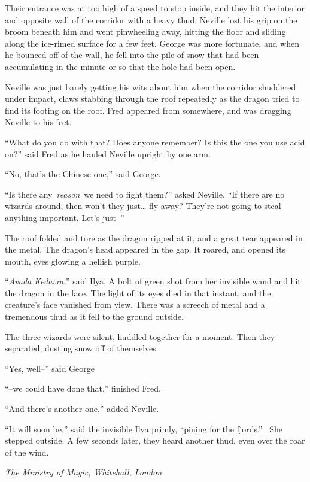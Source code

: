 Their entrance was at too high of a speed to stop inside, and they hit
the interior and opposite wall of the corridor with a heavy thud.
Neville lost his grip on the broom beneath him and went pinwheeling
away, hitting the floor and sliding along the ice-rimed surface for a
few feet. George was more fortunate, and when he bounced off of the
wall, he fell into the pile of snow that had been accumulating in the
minute or so that the hole had been open.

Neville was just barely getting his wits about him when the corridor
shuddered under impact, claws stabbing through the roof repeatedly as
the dragon tried to find its footing on the roof. Fred appeared from
somewhere, and was dragging Neville to his feet.

``What do you do with that? Does anyone remember? Is this the one you
use acid on?'' said Fred as he hauled Neville upright by one arm.

``No, that's the Chinese one,'' said George.

``Is there any~\emph{reason}~we need to fight them?'' asked Neville.
``If there are no wizards around, then won't they just\ldots{} fly away?
They're not going to steal anything important. Let's just--''

The roof folded and tore as the dragon ripped at it, and a great tear
appeared in the metal. The dragon's head appeared in the gap. It roared,
and opened its mouth, eyes glowing a hellish purple.

``\emph{Avada Kedavra},'' said Ilya. A bolt of green shot from her
invisible wand and hit the dragon in the face. The light of its eyes
died in that instant, and the creature's face vanished from view. There
was a screech of metal and a tremendous thud as it fell to the ground
outside.

The three wizards were silent, huddled together for a moment. Then they
separated, dusting snow off of themselves.

``Yes, well--'' said George

``--we could have done that,'' finished Fred.

``And there's another one,'' added Neville.

``It will soon be,'' said the invisible Ilya primly, ``pining for the
fjords.'' ~She stepped outside. A few seconds later, they heard another
thud, even over the roar of the wind.

\mybreak

\emph{The Ministry of Magic, Whitehall, London}\\

